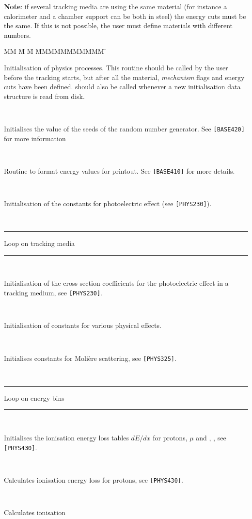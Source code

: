 {\bf Note}:
     if  several tracking media are using the same material
(for instance a calorimeter and a chamber support can be both in steel)
the energy cuts must be the same. If this is not possible,
the user must define materials with different numbers.
%
\begin{tabbing}
MM \= M \= M \= MMMMMMMMMMM \= \kill
{}     \> \> \> \> \parbox[t]{10cm}{Initialisation of physics
processes. This routine should be called by the user before the tracking
starts, but after all the material, {\it mechanism} flags and energy
cuts have been defined.  should also be called whenever
a new initialisation data structure is read from disk.} \rule{0cm}{.45cm} \\
 \>     \> \> \> 
\parbox[t]{10cm}{Initialises the value of the
seeds of the random number generator. See {\tt [BASE420]} for more 
information} \rule{0cm}{.45cm} \\
 \>     \> \> \> 
\parbox[t]{10cm}{Routine to format energy
values for printout. See {\tt [BASE410]} for more details.} \rule{0cm}{.45cm} \\
 \>     \> \> \> 
\parbox[t]{10cm}{Initialisation of the
constants for photoelectric effect (see {\tt [PHYS230]}).} \rule{0cm}{.45cm} \\
\rule[-.1cm]{6cm}{.05cm} Loop on tracking media 
\rule[-.1cm]{6cm}{.05cm} \rule{0cm}{.45cm} \\
 \>     \> \> \> \parbox[t]{10cm}{Initialisation of the cross
section coefficients for the photoelectric effect in a tracking medium, see
{\tt [PHYS230]}.}
\rule{0cm}{.45cm} \\
 \>     \> \> \> \parbox[t]{10cm}{Initialisation
of constants for various physical effects.} \rule{0cm}{.45cm} \\
 \> \>      \> \> \parbox[t]{10cm}{Initialises constants for
Moli\`ere scattering, see {\tt [PHYS325]}.} \rule{0cm}{.45cm} \\
\rule[-.1cm]{6cm}{.05cm} Loop on energy bins 
\rule[-.1cm]{6cm}{.05cm} \rule{0cm}{.45cm} \\
 \>     \> \> \> \parbox[t]{10cm}{Initialises the ionisation
energy loss tables
$dE/dx$ for protons, $\mu$ and \Pep, \Pem, see {\tt [PHYS430]}.} 
\rule{0cm}{.45cm} \\
 \> \>     \> \> \parbox[t]{10cm}{Calculates ionisation
energy loss for protons, see {\tt [PHYS430]}.} \rule{0cm}{.45cm} \\
 \> \>     \> \> \parbox[t]{10cm}{Calculates ionisation
}
\end{tabbing}
